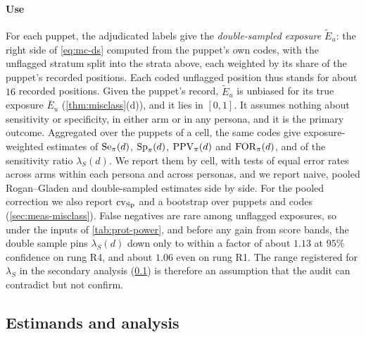 \paragraph{Use}
For each puppet, the adjudicated labels give the \emph{double-sampled exposure} $\widetilde E_u$: the right side of \eqref{eq:mc-ds} computed from the puppet's own codes, with the unflagged stratum split into the strata above, each weighted by its share of the puppet's recorded positions. Each coded unflagged position thus stands for about $16$ recorded positions. Given the puppet's record, $\widetilde E_u$ is unbiased for its true exposure $\bar E_u$ (\cref{thm:misclass}(d)), and it lies in $[0,1]$. It assumes nothing about sensitivity or specificity, in either arm or in any persona, and it is the primary outcome. Aggregated over the puppets of a cell, the same codes give exposure-weighted estimates of $\mathrm{Se}_\pi(d)$, $\mathrm{Sp}_\pi(d)$, $\mathrm{PPV}_\pi(d)$ and $\mathrm{FOR}_\pi(d)$, and of the sensitivity ratio $\lambda_S(d)$. We report them by cell, with tests of equal error rates across arms within each persona and across personas, and we report naive, pooled Rogan--Gladen and double-sampled estimates side by side. For the pooled correction we also report $\mathrm{cv}_{\mathrm{Sp}}$ and a bootstrap over puppets and codes (\cref{sec:meas-misclass}). False negatives are rare among unflagged exposures, so under the inputs of \cref{tab:prot-power}, and before any gain from score bands, the double sample pins $\lambda_S(d)$ down only to within a factor of about $1.13$ at $95\%$ confidence on rung R4, and about $1.06$ even on rung R1. The range registered for $\lambda_S$ in the secondary analysis (\cref{sec:prot-estimands}) is therefore an assumption that the audit can contradict but not confirm.

\subsection{Estimands and analysis}\label{sec:prot-estimands}

